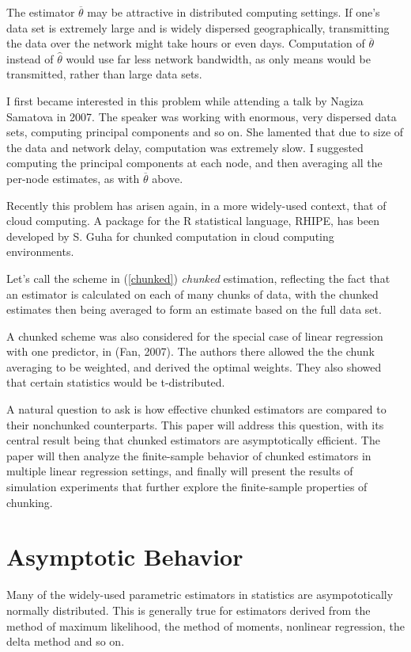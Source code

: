 The estimator $\overline{\theta}$ may be attractive in distributed
computing settings.  If one's data set is extremely large and is widely
dispersed geographically, transmitting the data over the network might
take hours or even days.  Computation of $\overline{\theta}$ instead of
$\widehat{\theta}$ would use far less network bandwidth, as only means
would be transmitted, rather than large data sets.

I first became interested in this problem while attending a talk by
Nagiza Samatova in 2007.  The speaker was working with enormous, very
dispersed data sets, computing principal components and so on.  She
lamented that due to size of the data and network delay, computation was
extremely slow.  I suggested computing the principal components at each
node, and then averaging all the per-node estimates, as with
$\overline{\theta}$ above.

Recently this problem has arisen again, in a more widely-used context,
that of cloud computing.  A package for the R statistical language,
RHIPE, has been developed by S. Guha for chunked computation in cloud
computing environments.

Let's call the scheme in (\ref{chunked}) {\it chunked} estimation,
reflecting the fact that an estimator is calculated on each of many
chunks of data, with the chunked estimates then being averaged to form
an estimate based on the full data set.

A chunked scheme was also considered for the special case of linear
regression with one predictor, in (Fan, 2007).  The authors there
allowed the the chunk averaging to be weighted, and derived the optimal
weights.  They also showed that certain statistics would be
t-distributed.

A natural question to ask is how effective chunked estimators are
compared to their nonchunked counterparts.  This paper will address this
question, with its central result being that  chunked estimators are
asymptotically efficient.  The paper will then analyze the finite-sample
behavior of chunked estimators in multiple linear regression settings,
and finally will present the results of simulation experiments that
further explore the finite-sample properties of chunking.

\section{Asymptotic Behavior}

Many of the widely-used parametric estimators in statistics are
asympototically normally distributed.  This is generally true for
estimators derived from the method of maximum likelihood, the method of
moments, nonlinear regression, the delta method and so on.

